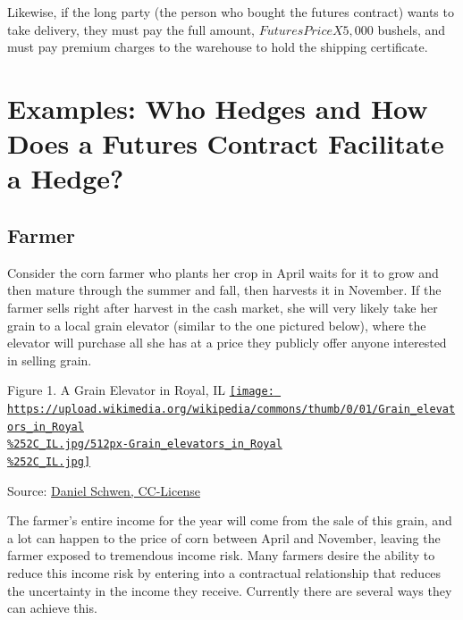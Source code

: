 \documentclass[
]{book}
\begin{document}
Likewise, if the long party (the person who bought the futures contract) wants to take delivery, they must pay the full amount, \(Futures Price X 5,000\) bushels, and must pay premium charges to the warehouse to hold the shipping certificate.

\hypertarget{examples-who-hedges-and-how-does-a-futures-contract-facilitate-a-hedge}{%
\section{Examples: Who Hedges and How Does a Futures Contract Facilitate a Hedge?}\label{examples-who-hedges-and-how-does-a-futures-contract-facilitate-a-hedge}}

\hypertarget{farmer}{%
\subsection{Farmer}\label{farmer}}

Consider the corn farmer who plants her crop in April waits for it to grow and then mature through the summer and fall, then harvests it in November. If the farmer sells right after harvest in the cash market, she will very likely take her grain to a local grain elevator (similar to the one pictured below), where the elevator will purchase all she has at a price they publicly offer anyone interested in selling grain.

Figure 1. A Grain Elevator in Royal, IL \href{https://commons.wikimedia.org/wiki/File\%3AGrain_elevators_in_Royal\%2C_IL.jpg}{\texttt{[image: https://upload.wikimedia.org/wikipedia/commons/thumb/0/01/Grain\_elevators\_in\_Royal\\\%252C\_IL.jpg/512px-Grain\_elevators\_in\_Royal\\\%252C\_IL.jpg]}}

Source: \href{https://commons.wikimedia.org/wiki/File\%3AGrain_elevators_in_Royal\%2C_IL.jpg}{Daniel Schwen, CC-License}

The farmer's entire income for the year will come from the sale of this grain, and a lot can happen to the price of corn between April and November, leaving the farmer exposed to tremendous income risk. Many farmers desire the ability to reduce this income risk by entering into a contractual relationship that reduces the uncertainty in the income they receive. Currently there are several ways they can achieve this.
\end{document}
